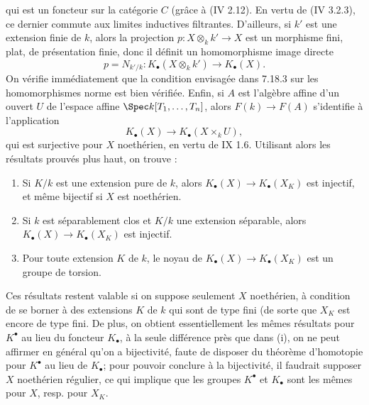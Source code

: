 qui est un
foncteur sur la catégorie \(C\) (grâce à (IV 2.12). En vertu de (IV 3.2.3), ce dernier commute aux limites inductives filtrantes. D'ailleurs, si \(k'\) est une extension finie de \(k\), alors la projection \(p:X\otimes_k k'\to X\) est un morphisme fini, plat, de présentation finie, donc il définit un homomorphisme image directe
\[
  p=N_{k'/k}:K_\bullet(X\otimes_k k')\longrightarrow K_\bullet(X).
\]
On vérifie immédiatement que la condition envisagée dans 7.18.3 sur les homomorphismes norme est bien vérifiée. Enfin, si \(A\) est l'algèbre affine d'un ouvert \(U\) de l'espace affine \(\Spec k[T_1,\ldots,T_n]\), alors \(F(k)\to F(A)\) s'identifie à l'application
\[
  K_\bullet(X)\longrightarrow K_\bullet(X\times_k U),
\]
qui est surjective pour \(X\) noethérien, en vertu de IX 1.6. Utilisant alors les résultats prouvés plus haut, on trouve :
\begin{enumerate}[label=(\roman*)]
\item Si \(K/k\) est une extension pure de \(k\), alors \(K_\bullet(X)\longrightarrow K_\bullet(X_K)\) est injectif, et même bijectif si \(X\) est noethérien.
\item Si \(k\) est séparablement clos et \(K/k\) une extension séparable, alors \(K_\bullet(X)\longrightarrow K_\bullet(X_K)\) est injectif.
\item Pour toute extension \(K\) de \(k\), le noyau de \(K_\bullet(X)\longrightarrow K_\bullet(X_K)\) est un groupe de torsion.
\end{enumerate}
Ces résultats restent valable si on suppose seulement \(X\) noethérien, à condition de se borner à des extensions \(K\) de \(k\) qui sont de type fini (de sorte que \(X_K\) est encore de type fini. De plus, on obtient essentiellement les mêmes résultats pour \(K^\bullet\) au lieu du foncteur \(K_\bullet\), à la seule différence près que dans (i), on ne peut affirmer en général qu'on a bijectivité, faute de disposer du théorème d'homotopie pour \(K^\bullet\) au lieu de \(K_\bullet\); pour pouvoir conclure à la bijectivité, il faudrait supposer \(X\) noethérien régulier, ce qui implique que les groupes \(K^\bullet\) et \(K_\bullet\) sont les mêmes pour \(X\), resp. pour \(X_K\).

